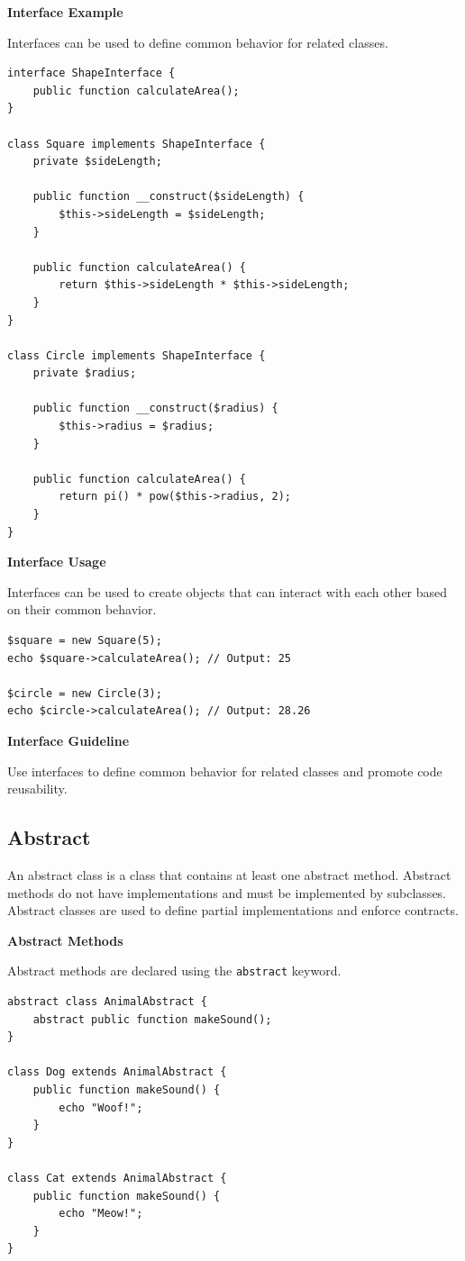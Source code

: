 \documentclass[11pt]{article}
\begin{document}
\textbf{Interface Example}

Interfaces can be used to define common behavior for related classes.

\begin{verbatim}
interface ShapeInterface {
    public function calculateArea();
}

class Square implements ShapeInterface {
    private $sideLength;

    public function __construct($sideLength) {
        $this->sideLength = $sideLength;
    }

    public function calculateArea() {
        return $this->sideLength * $this->sideLength;
    }
}

class Circle implements ShapeInterface {
    private $radius;

    public function __construct($radius) {
        $this->radius = $radius;
    }

    public function calculateArea() {
        return pi() * pow($this->radius, 2);
    }
}
\end{verbatim}

\textbf{Interface Usage}

Interfaces can be used to create objects that can interact with each
other based on their common behavior.

\begin{verbatim}
$square = new Square(5);
echo $square->calculateArea(); // Output: 25

$circle = new Circle(3);
echo $circle->calculateArea(); // Output: 28.26
\end{verbatim}

\textbf{Interface Guideline}

Use interfaces to define common behavior for related classes and promote
code reusability.

\subsection{\textbf{Abstract}}
\label{sec:org0bebb5d}
An abstract class is a class that contains at least one abstract method.
Abstract methods do not have implementations and must be implemented by
subclasses. Abstract classes are used to define partial implementations
and enforce contracts.

\textbf{Abstract Methods}

Abstract methods are declared using the \texttt{abstract} keyword.

\begin{verbatim}
abstract class AnimalAbstract {
    abstract public function makeSound();
}

class Dog extends AnimalAbstract {
    public function makeSound() {
        echo "Woof!";
    }
}

class Cat extends AnimalAbstract {
    public function makeSound() {
        echo "Meow!";
    }
}
\end{verbatim}
\end{document}
